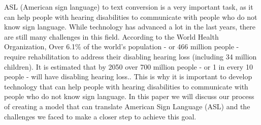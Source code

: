 \documentclass[../paper.tex]{subfiles}
\begin{document}
    ASL (American sign language) to text conversion is a very important task, as it can help people with hearing disabilities to communicate with people who do not know sign language.
    While technology has advanced a lot in the last years, there are still many challenges in this field.
    According to the World Health Organization, Over 6.1\% of the world's population - or 466 million people - require rehabilitation to address their disabling hearing loss (including 34 million children).
    It is estimated that by 2050 over 700 million people - or 1 in every 10 people - will have disabling hearing loss.\cite{i0}.
    This is why it is important to develop technology that can help people with hearing disabilities to communicate with people who do not know sign language.
    In this paper we will discuss our process of creating a model that can translate American Sign Language (ASL) and the challenges we faced to make a closer step to achieve this goal.
\end{document}

